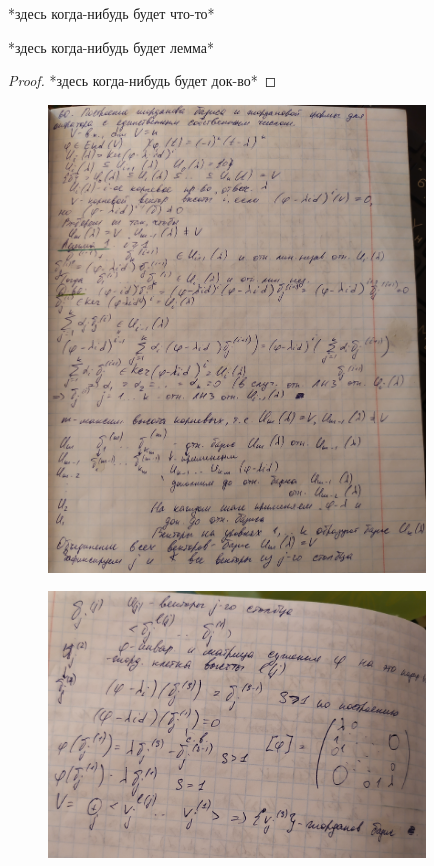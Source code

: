\documentclass[algebra]{subfiles}
\begin{document}
    *здесь когда-нибудь будет что-то*

    \begin{lemma}[1]
      *здесь когда-нибудь будет лемма*
    \end{lemma}

    \begin{proof}
      *здесь когда-нибудь будет док-во*
    \end{proof}

    \begin{figure}[H]
            \includegraphics[width=10cm]{pics/l60_1}
            \centering
    \end{figure}

    \begin{figure}[H]
            \includegraphics[width=10cm]{pics/l60_2}
            \centering
    \end{figure}
\end{document}
